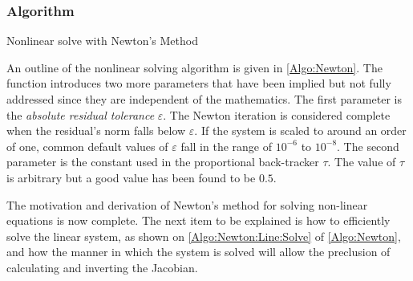 \subsubsection{Algorithm}

\begin{algorithm}[t]
    \caption{Nonlinear solve with Newton's Method}
    \label{Algo:Newton}
\end{algorithm}

An outline of the nonlinear solving algorithm is given in \cref{Algo:Newton}.
The function introduces two more parameters that have been implied but not fully addressed since they are independent of the mathematics.
The first parameter is the \textit{absolute residual tolerance} $\varepsilon$.
The Newton iteration is considered complete when the residual's norm falls below $\varepsilon$.
If the system is scaled to around an order of one, common default values of $\varepsilon$ fall in the range of $10^{-6}$ to $10^{-8}$.
The second parameter is the constant used in the proportional back-tracker $\tau$.
The value of $\tau$ is arbitrary but a good value has been found to be $0.5$.

The motivation and derivation of Newton's method for solving non-linear equations is now complete.
The next item to be explained is how to efficiently solve the linear system, as shown on \cref{Algo:Newton:Line:Solve} of \cref{Algo:Newton}, and how the manner in which the system is solved will allow the preclusion of calculating and inverting the Jacobian.



